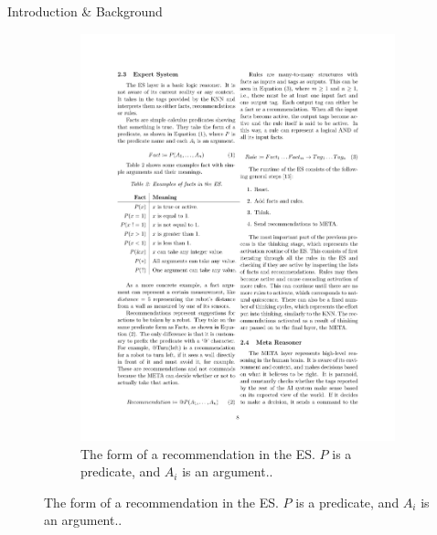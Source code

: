 \documentclass[final]{beamer} %
\begin{document}
\begin{frame}
\begin{columns}
\begin{column}{.33\textwidth}
{\begin{block}{Introduction \& Background}
{\begin{figure}[!htb]
\begin{subfigure}[!htb]{0.58\columnwidth}
							\includegraphics[width=0.7\columnwidth]{figures/recommendation.pdf}
							\caption{The form of a recommendation in the ES. $P$ is a predicate, and $A_i$ is an argument..}
							
							\vspace{1ex}
							

\end{subfigure}
\end{figure}}
\end{block}}
\end{column}
\end{columns}
\end{frame}
\end{document}

